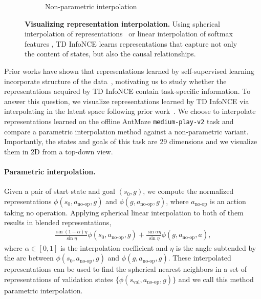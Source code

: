 \documentclass{article} %
\begin{document}
\begin{figure}[t]
\begin{subfigure}[c]{0.49\textwidth}
        \caption{Non-parametric interpolation}
    \end{subfigure}
    \caption{\textbf{Visualizing representation interpolation.} Using spherical interpolation of representations \figleft~or linear interpolation of softmax features \figright, TD InfoNCE learns representations that capture not only the content of states, but also the causal relationships.
    }
    \label{fig:latent-interp}
\end{figure}

Prior works have shown that representations learned by self-supervised learning incorporate structure of the data~\citep{wang2020understanding, arora2019theoretical}, motivating us to study whether the representations acquired by TD InfoNCE contain task-specific information. To answer this question, we visualize representations learned by TD InfoNCE via interpolating in the latent space following prior work~\citep{zheng2023stabilizing}. We choose to interpolate representations learned on the offline AntMaze \texttt{medium-play-v2} task and compare a parametric interpolation method against a non-parametric variant. Importantly, the states and goals of this task are 29 dimensions and we visualize them in 2D from a top-down view.

\paragraph{Parametric interpolation.} Given a pair of start state and goal $(s_0, g)$, we compute the normalized representations $\phi(s_0, a_{\text{no-op}}, g)$ and $\phi(g, a_{\text{no-op}}, g)$, where $a_{\text{no-op}}$ is an action taking no operation. Applying spherical linear interpolation to both of them results in blended representations, 
\begin{align*}
    \frac{\sin (1 - \alpha) \eta}{\sin \eta} \phi(s_0, a_{\text{no-op}}, g) + \frac{\sin \alpha \eta}{\sin \eta} \phi(g, a_{\text{no-op}}, a),
\end{align*}
where $\alpha \in [0, 1]$ is the interpolation coefficient and $\eta$ is the angle subtended by the arc between $\phi(s_0, a_{\text{no-op}}, g)$ and $\phi(g, a_{\text{no-op}}, g)$.
These interpolated representations can be used to find the spherical nearest neighbors in a set of representations of validation states $\{\phi(s_{\text{val}}, a_{\text{no-op}}, g) \}$ and we call this method parametric interpolation.
\end{document}
